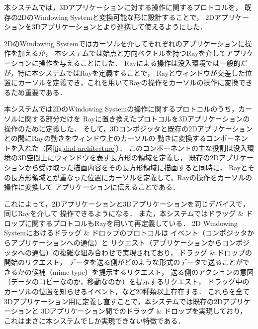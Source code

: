 
本システムでは，3Dアプリケーションに対する操作に関するプロトコルを，
既存の2DのWindowing Systemと変換可能な形に設計することで，
2Dアプリケーションを3Dアプリケーションとより連携して使えるようにした．

2DのWindowing Systemではカーソルを介してそれぞれのアプリケーションに操作を加えるが，
本システムでは始点と方向ベクトルを持つRayを介してアプリケーションに操作を与えることにした．
Rayによる操作は没入環境では一般的だが，特に本システムではRayを定義することで，
Rayとウィンドウが交差した位置にカーソルを定義でき，これを用いてRayの操作をカーソルの操作に変換できるため重要である．

本システムでは2DのWindowing Systemの操作に関するプロトコルのうち，カーソルに関する部分だけを
Rayに置き換えたプロトコルを3Dアプリケーションの操作のために定義した．
そして，3Dコンポジッタと既存の2Dアプリケーションとの間にRayの動きをウィンドウ上のカーソルの
動きに変換するコンポーネントを入れた（図\ref{fig:dnd-architecture}）．
このコンポーネントの主な役割は没入環境の3D空間上にウィンドウを表す長方形の領域を定義し，
既存の2Dアプリケーションから受け取った描画内容をその長方形領域に描画すると同時に，
Rayとその長方形領域とが重なった位置にカーソルを定義して，Rayの操作をカーソルの操作に変換して
アプリケーションに伝えることである．

これによって，2Dアプリケーションと3Dアプリケーションを同じデバイスで，同じRayを介して
操作できるようになる．
また，本システムではドラッグ \& ドロップに関するプロトコルもRayを用いて再定義している．
2D Windowing Systemにおけるドラッグ \& ドロップのプロトコルは
イベント（コンポジッタからアプリケーションへの通信）と
リクエスト（アプリケーションからコンポジッタへの通信）の複雑な組み合わせで実現されており，
ドラッグ \& ドロップの開始のリクエスト，
データを送る側がどのような形式のデータで送ることができるかの候補（mime-type）を提示するリクエスト，
送る側のアクションの意図（データのコピーなのか，移動なのか）を提示するリクエスト，
ドラッグ中のカーソルの位置を知らせるイベント，など20種類以上存在する．
これらを全て3Dアプリケーション用に定義し直すことで，本システムでは既存の2Dアプリケーションと
3Dアプリケーション間でのドラッグ \& ドロップを実現しており，
これはまさに本システムでしか実現できない特徴である．


